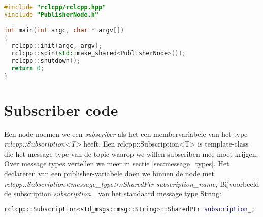 \begin{lstlisting}[language=C++, caption={mainPublisher.cpp}, firstnumber=0, label={code:hello_world_publisher_main}]
#include "rclcpp/rclcpp.hpp"
#include "PublisherNode.h"

int main(int argc, char * argv[])
{
  rclcpp::init(argc, argv);
  rclcpp::spin(std::make_shared<PublisherNode>());
  rclcpp::shutdown();
  return 0;
}

\end{lstlisting}


\section{Subscriber code}
Een node noemen we een \textit{subscriber} als het een membervariabele van het type \textit{rclcpp::Subscription<T>} heeft. Een rclcpp::Subscription<T> is template-class die het message-type van de topic waarop we willen subscriben mee moet krijgen. Over message types vertellen we meer in sectie \ref{sec:message_types}. Het declareren van een publisher-variabele doen we binnen de node met \textit{rclcpp::Subscription<message\_type>::SharedPtr subscription\_name;} Bijvoorbeeld de subscription \textit{subscription\_} van het standaard message type String:
\begin{lstlisting}[language=C++, firstnumber=0, label={}]
rclcpp::Subscription<std_msgs::msg::String>::SharedPtr subscription_;
\end{lstlisting}

